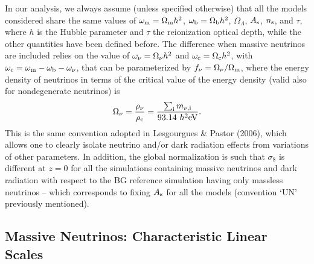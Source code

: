 \documentclass{emulateapj}
\begin{document}
In our analysis, we always assume (unless specified otherwise) that all the models considered
share the same  values of
$\omega_{\rm m} = \Omega_{\rm m} h^2$, $\omega_{\rm b}=\Omega_{\rm b} h^2$, $\Omega_{\Lambda}$, $A_{\rm s}$, $n_{\rm s}$, and $\tau$, where $h$ is the Hubble parameter
and $\tau$ the reionization optical depth, while the other quantities have been defined before. 
The difference when massive neutrinos are included 
relies on the value of $\omega_{\nu}=\Omega_{\rm \nu} h^2$ and $\omega_{\rm c}=\Omega_{\rm c} h^2$, with
 $\omega_{\rm c}=\omega_{\rm m} - \omega_{\rm b} - \omega_{\nu}$, that
can be parameterized by $f_{\nu} = \Omega_{\nu} / \Omega_{\rm m}$, where
the energy density of neutrinos in terms of the critical value of the energy density (valid also for nondegenerate neutrinos) is
\begin{equation}
\Omega_{\nu} = {\rho_{\nu} \over \rho_{\rm c} } = { \sum_{\rm i} m_{\rm \nu, i} \over 93.14~h^2 {\rm eV} }.
\end{equation}
This is the same convention adopted in Lesgourgues \& Pastor (2006),
which allows one to clearly isolate neutrino and/or dark radiation effects from variations of other parameters. 
In addition, the global normalization is such that $\sigma_8$ is different at $z=0$ for all the simulations containing massive neutrinos and dark
radiation with respect to the BG  reference simulation having only massless neutrinos --  which corresponds to
fixing $A_{\rm s}$ for all the models  (convention `UN' previously mentioned). 


\subsection{Massive Neutrinos: Characteristic Linear Scales}
\end{document}
